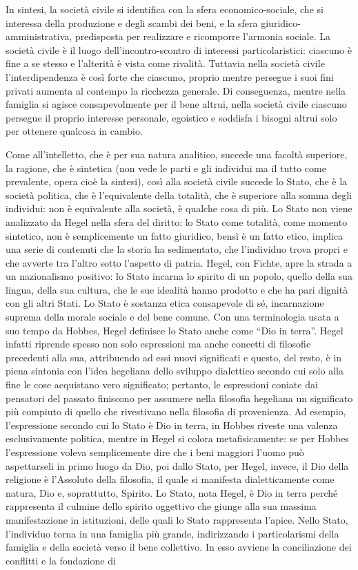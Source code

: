 \documentclass[a4paper,12pt,oneside,openany]{book}%
\begin{document}
In sintesi, la società civile si identifica con la sfera economico-sociale, che si interessa della produzione e degli scambi dei beni, e la sfera giuridico-amministrativa, predisposta per realizzare e ricomporre l’armonia sociale. La società civile è il luogo dell’incontro-scontro di interessi particolaristici: ciascuno è fine a se stesso e l’alterità è vista come rivalità. Tuttavia nella società civile l’interdipendenza è così forte che ciascuno, proprio mentre persegue i suoi fini privati aumenta al contempo la ricchezza generale. Di conseguenza, mentre nella famiglia si agisce consapevolmente per il bene altrui, nella società civile ciascuno persegue il proprio interesse personale, egoistico e soddisfa i bisogni altrui solo per ottenere qualcosa in cambio.

Come all’intelletto, che è per sua natura analitico, succede una facoltà superiore, la ragione, che è sintetica (non vede le parti e gli individui ma il tutto come prevalente, opera cioè la sintesi), così alla società civile succede lo Stato, che è la società politica, che è l’equivalente della totalità, che è superiore alla somma degli individui: non è equivalente alla società, è qualche cosa di più. Lo Stato non viene analizzato da Hegel nella sfera del diritto: lo Stato come totalità, come momento sintetico, non è semplicemente un fatto giuridico, bensì è un fatto etico, implica una serie di contenuti che la storia ha sedimentato, che l’individuo trova propri e che avverte tra l’altro sotto l’aspetto di patria. Hegel, con Fichte, apre la strada a un nazionalismo positivo: lo Stato incarna lo spirito di un popolo, quello della sua lingua, della sua cultura, che le sue idealità hanno prodotto e che ha pari dignità con gli altri Stati. Lo Stato è sostanza etica consapevole di sé, incarnazione suprema della morale sociale e del bene comune. Con una terminologia usata a suo tempo da Hobbes, Hegel definisce lo Stato anche come “Dio in terra”. Hegel infatti riprende spesso non solo espressioni ma anche concetti di filosofie precedenti alla sua, attribuendo ad essi nuovi significati e questo, del resto, è in piena sintonia con l’idea hegeliana dello sviluppo dialettico secondo cui solo alla fine le cose acquistano vero significato; pertanto, le espressioni coniate dai pensatori del passato finiscono per assumere nella filosofia hegeliana un significato più compiuto di quello che rivestivano nella filosofia di provenienza. Ad esempio, l’espressione secondo cui lo Stato è Dio in terra, in Hobbes riveste una valenza esclusivamente politica, mentre in Hegel si colora metafisicamente: se per Hobbes l’espressione voleva semplicemente dire che i beni maggiori l’uomo può aspettarseli in primo luogo da Dio, poi dallo Stato, per Hegel, invece, il Dio della religione è l’Assoluto della filosofia, il quale si manifesta dialetticamente come natura, Dio e, soprattutto, Spirito. Lo Stato, nota Hegel, è Dio in terra perché rappresenta il culmine dello spirito oggettivo che giunge alla sua massima manifestazione in istituzioni, delle quali lo Stato rappresenta l’apice. Nello Stato, l’individuo torna in una famiglia più grande, indirizzando i particolarismi della famiglia e della società verso il bene collettivo. In esso avviene la conciliazione dei conflitti e la fondazione di 
\end{document}
